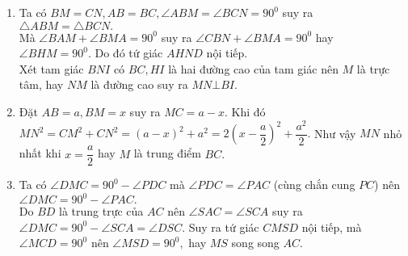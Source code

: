 \begin{ex}
{\begin{center}
\begin{tikzpicture}[>=stealth,scale=1, line join = round, line cap = round]
			\end{tikzpicture}
		\end{center}
		\begin{enumerate}
\item Ta có $BM=CN, AB=BC, \angle ABM=\angle BCN=90^0$ suy ra $\triangle ABM=\triangle BCN.$\\
Mà $\angle BAM+\angle BMA=90^0$ suy ra $\angle CBN+\angle BMA=90^0$ hay $\angle BHM=90^0.$ Do đó tứ giác $AHND$ nội tiếp.\\
Xét tam giác $BNI$ có $BC, HI$ là hai đường cao của tam giác nên $M$ là trực tâm, hay $NM$ là đường cao suy ra $MN\bot BI.$
\item Đặt $AB=a, BM=x$ suy ra $MC=a-x.$ Khi đó $MN^2=CM^2+CN^2=(a-x)^2+a^2=2(x-\dfrac{a}{2})^2+\dfrac{a^2}{2}.$ Như vậy $MN$ nhỏ nhất khi $x=\dfrac{a}{2}$ hay $M$ là trung điểm $BC.$
\item Ta có $\angle DMC=90^0-\angle PDC$ mà $\angle PDC=\angle PAC$ (cùng chắn cung $PC$) nên $\angle DMC=90^0-\angle PAC.$\\
Do $BD$ là trung trực của $AC$ nên $\angle SAC=\angle SCA$ suy ra $\angle DMC=90^0-\angle SCA=\angle DSC.$ Suy ra tứ giác $CMSD$ nội tiếp, mà $\angle MCD= 90^0$ nên $\angle MSD=90^0,$ hay $MS$ song song $AC.$
		\end{enumerate}
	}
\end{ex}
